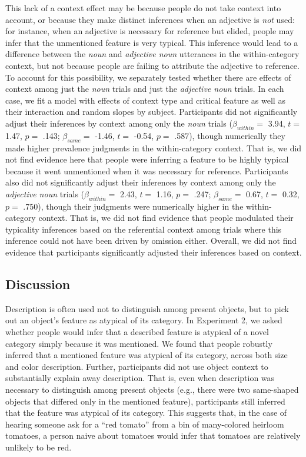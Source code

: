 \documentclass[
  english,
  man,floatsintext]{apa6}
\begin{document}
This lack of a context effect may be because people do not take context into account, or because they make distinct inferences when an adjective is \emph{not} used: for instance, when an adjective is necessary for reference but elided, people may infer that the unmentioned feature is very typical. This inference would lead to a difference between the \emph{noun} and \emph{adjective noun} utterances in the within-category context, but not because people are failing to attribute the adjective to reference. To account for this possibility, we separately tested whether there are effects of context among just the \emph{noun} trials and just the \emph{adjective noun} trials. In each case, we fit a model with effects of context type and critical feature as well as their interaction and random slopes by subject.
Participants did not significantly adjust their inferences by context among only the \emph{noun} trials (\(\beta_{within} =\) 3.94, \(t =\) 1.47, \(p =\) .143; \(\beta_{same} =\) -1.46, \(t =\) -0.54, \(p =\) .587), though numerically they made higher prevalence judgments in the within-category context. That is, we did not find evidence here that people were inferring a feature to be highly typical because it went unmentioned when it was necessary for reference. Participants also did not significantly adjust their inferences by context among only the \emph{adjective noun} trials (\(\beta_{within} =\) 2.43, \(t =\) 1.16, \(p =\) .247; \(\beta_{same} =\) 0.67, \(t =\) 0.32, \(p =\) .750), though their judgments were numerically higher in the within-category context. That is, we did not find evidence that people modulated their typicality inferences based on the referential context among trials where this inference could not have been driven by omission either. Overall, we did not find evidence that participants significantly adjusted their inferences based on context.

\hypertarget{discussion-1}{%
\subsection{Discussion}\label{discussion-1}}

Description is often used not to distinguish among present objects, but to pick out an object's feature as atypical of its category. In Experiment 2, we asked whether people would infer that a described feature is atypical of a novel category simply because it was mentioned. We found that people robustly inferred that a mentioned feature was atypical of its category, across both size and color description. Further, participants did not use object context to substantially explain away description. That is, even when description was necessary to distinguish among present objects (e.g., there were two same-shaped objects that differed only in the mentioned feature), participants still inferred that the feature was atypical of its category. This suggests that, in the case of hearing someone ask for a ``red tomato'' from a bin of many-colored heirloom tomatoes, a person naive about tomatoes would infer that tomatoes are relatively unlikely to be red.
\end{document}
